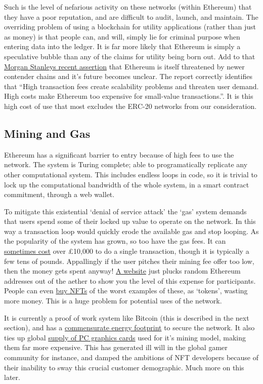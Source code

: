 Such is the level of nefarious activity on these networks (within Ethereum) that they have a poor reputation, and are difficult to audit, launch, and maintain. The overriding problem of using a blockchain for utility applications (rather than just as money) is that people can, and will, simply lie for criminal purpose when entering data into the ledger. It is far more likely that Ethereum is simply a speculative bubble than any of the claims for utility being born out. Add to that \href{https://advisor.morganstanley.com/daron.edwards/documents/field/d/da/daron-edwards/Cryptocurrency_201__What_is_Ethereum_.pdf}{Morgan Stanleys recent assertion} that Ethereum is itself threatened by newer contender chains and it's future becomes unclear. The report correctly identifies that ``High transaction fees create scalability problems and threaten user demand. High costs make Ethereum too expensive for small-value transactions.''. It is this high cost of use that most excludes the ERC-20 networks from our consideration.
\subsection{Mining and Gas}
Ethereum has a significant barrier to entry because of high fees to use the network. The system is Turing complete; able to programatically replicate any other computational system. This includes endless loops in code, so it is trivial to lock up the computational bandwidth of the whole system, in a smart contract commitment, through a web wallet. \par 
To mitigate this existential `denial of service attack' the `gas' system demands that users spend some of their locked up value to operate on the network. In this way a transaction loop would quickly erode the available gas and stop looping. As the popularity of the system has grown, so too have the gas fees. It can \href{https://twitter.com/Blockworks_/status/1521071340517830657}{sometimes cost} over £10,000 to do a single transaction, though it is typically a few tens of pounds. Appallingly if the user pitches their mining fee offer too low, then the money gets spent anyway! \href{https://fees.wtf/#/}{A website} just plucks random Ethereum addresses out of the aether to show you the level of this expense for participants. People can even \href{https://opensea.io/collection/fees-wtf-nft?search[sortAscending]=false&search[sortBy]=PRICE}{buy NFTs} of the worst examples of these, as `tokens', wasting more money. This is a huge problem for potential uses of the network. \par
It is currently a proof of work system like Bitcoin (this is described in the next section), and has a \href{https://news.trust.org/packages/cryptocurrency-and-climate/}{commensurate energy footprint} to secure the network. It also ties up global \href{https://www.techradar.com/in/news/ethereum-miners-spent-dollar15-billion-on-gpus-in-just-over-one-year}{supply of PC graphics cards} used for it's mining model, making them far more expensive. This has generated ill will in the global gamer community for instance, and damped the ambitions of NFT developers because of their inability to sway this crucial customer demographic. Much more on this later.\par
